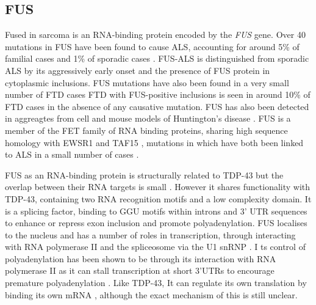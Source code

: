 %
%
%
%
%






\subsection{FUS}
Fused in sarcoma is an RNA-binding protein encoded by the \textit{FUS} gene. Over 40 mutations in FUS have been found to cause ALS, accounting for around 5\% of familial cases and 1\% of sporadic cases \citep{Vance2009-ye,Tan07102016}. 
FUS-ALS is distinguished from sporadic ALS by its aggressively early onset and the presence of FUS protein in cytoplasmic inclusions. 
FUS mutations have also been found in a very small number of FTD cases \citep{VanLangenhove2010,Broustal2010}
FTD with FUS-positive inclusions is seen in around 10\% of FTD cases \citep{Neumann2009} in the absence of any causative mutation. 
FUS has also been detected in aggreagtes from cell and mouse models of Huntington's disease \citep{Doi2008, Kino2016}.
FUS is a member of the FET family of RNA binding proteins, sharing high sequence homology with EWSR1 and TAF15 \citep{Kovar2011}, mutations in which have both been linked to ALS in a small number of cases \citep{Neumann2011, Couthouis2011,Ticozzi2011-bs,Couthouis2012}.

FUS as an RNA-binding protein is structurally related to TDP-43 but the overlap between their RNA targets is small \citep{Lagier-Tourenne2012-wa,Rogelj2012,Colombrita2012, Honda2014}. 
However it shares functionality with TDP-43, containing two RNA recognition motifs and a low complexity domain. 
It is a splicing factor, binding to GGU motifs within introns and 3' UTR sequences \citep{Rogelj2012,Lagier-Tourenne2012-wa} to enhance or repress exon inclusion and promote polyadenylation. 
FUS localises to the nucleus and has a number of roles in transcription, through interacting with RNA polymerase II and the spliceosome via the U1 snRNP \citep{Sun2015a, Yu2015a, Yu2015b}. I
ts control of polyadenylation has been shown to be through its interaction with RNA polymerase II as it can stall transcription at short 3'UTRs to encourage premature polyadenylation \citep{Masuda2015}. 
Like TDP-43, It can regulate its own translation by binding its own mRNA \citep{Zhou2013}, although the exact mechanism of this is still unclear.


